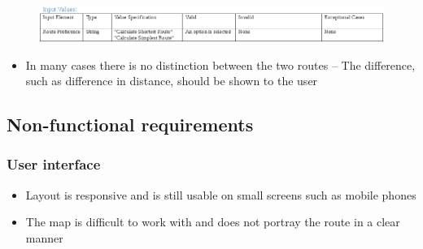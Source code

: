 \documentclass[english]{article}
\begin{document}
\begin{figure}[ht!]
\hspace*{-2.5cm}
\includegraphics[width=180mm]{Nav3.png}
\end{figure}
\begin{itemize}
\item	In many cases there is no distinction between the two routes – The difference, such as difference in distance, should be shown to the user\\
\end{itemize}
\subsection{Non-functional requirements}
\subsubsection{User interface}
\begin{itemize}
\item	Layout is responsive and is still usable on small screens such as mobile phones\\
\item	The map is difficult to work with and does not portray the route in a clear manner\\
\end{itemize}
\end{document}
